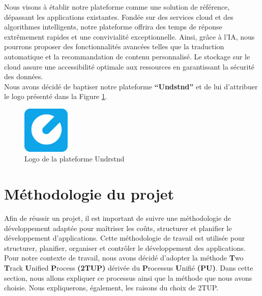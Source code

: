 \vspace{0.5em}
\noindent Nous visons à établir notre plateforme comme une solution de référence, dépassant les applications existantes. Fondée sur des services cloud et des algorithmes intelligents, notre plateforme offrira des temps de réponse extrêmement rapides et une convivialité exceptionnelle. Ainsi, grâce à l'IA, nous pourrons proposer des fonctionnalités avancées telles que la traduction automatique et la recommandation de contenu personnalisé. Le stockage sur le cloud assure une accessibilité optimale aux ressources en garantissant la sécurité des données.\\
Nous avons  décidé de baptiser notre plateforme \textbf{“Undstnd”} et de lui d’attribuer le logo présenté dans la Figure \ref{fig:undrstnd-logo}. 
\begin{figure}[H]
    \centering
    \includegraphics[width=0.2\textwidth,height=0.2\textwidth]{images/logo.png}
    \caption{Logo de la plateforme Undrstnd}
    \label{fig:undrstnd-logo}    
\end{figure}

\section{Méthodologie du projet}
Afin de réussir un projet, il est important de suivre une méthodologie de développement adaptée pour maîtriser les coûts, structurer et planifier le développement d'applications. Cette méthodologie de travail est utilisée pour structurer, planifier, organiser et contrôler le développement des applications. \\
Pour notre contexte de travail, nous avons décidé  d'adopter la méthode \textbf{T}wo \textbf{T}rack \textbf{U}nified \textbf{P}rocess \textbf{(2TUP)} dérivée du \textbf{P}rocessus \textbf{U}nifié \textbf{(PU)}. Dans cette section, nous allons expliquer ce processus ainsi que la méthode que nous avons choisie. Nous expliquerons, également, les raisons du choix de 2TUP.

